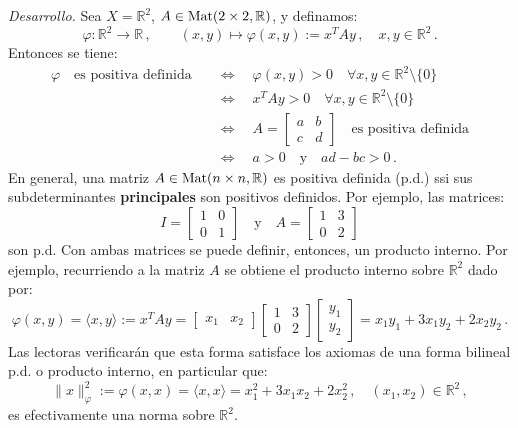 \documentclass[12pt,reqno]{amsart}
\begin{document}
\smallskip\noindent
\emph{Desarrollo.}
Sea $X=\mathbb{R}^2$, $A\in{\rm Mat}(2\times 2,\mathbb{R})$, y definamos:
\begin{equation*}
\varphi: \mathbb{R}^2 \rightarrow \mathbb{R}\,,\qquad
(x,y)\mapsto \varphi(x,y):= x^{T}Ay\,,\quad x,y\in\mathbb{R}^2\,.
\end{equation*}
Entonces se tiene:
\begin{align*}
\varphi\quad\text{es positiva definida}\quad
& \Leftrightarrow\quad \varphi(x,y)> 0\quad
  \forall x,y\in\mathbb{R}^2\setminus\{0\} \\
& \Leftrightarrow\quad x^{T}Ay> 0\quad
  \forall x,y\in\mathbb{R}^2\setminus\{0\}\quad \\
& \Leftrightarrow\quad 
  A=\begin{bmatrix} a & b \\ c & d \end{bmatrix}\quad
  \text{es positiva definida} \\
& \Leftrightarrow\quad 
  a>0\quad\text{y}\quad ad-bc>0\,.
\end{align*}
En general, una matriz $A\in{\rm Mat}(n\times n,\mathbb{R})$
es positiva definida (p.d.) ssi sus subdeterminantes
{\color{red}\bf principales} son positivos definidos.
Por ejemplo, las matrices:
$$
I=\begin{bmatrix} 1 & 0 \\ 0 & 1 \end{bmatrix}
\quad\text{y}\quad 
A=\begin{bmatrix} 1 & 3 \\ 0 & 2 \end{bmatrix}
$$
son p.d.
Con ambas matrices se puede definir, entonces, un producto interno.
Por ejemplo, recurriendo a la matriz $A$ se obtiene el producto interno
sobre $\mathbb{R}^2$ dado por:
$$
\varphi(x,y) = \langle x,y\rangle := x^{T}Ay
= \begin{bmatrix} x_1 & x_2 \end{bmatrix}
  \begin{bmatrix} 1 & 3 \\ 0 & 2 \end{bmatrix}
  \begin{bmatrix} y_1 \\ y_2 \end{bmatrix}
= x_1y_1 + 3x_1 y_2 + 2 x_2 y_2\,.
$$
Las lectoras verificar\'an que esta forma satisface los axiomas de una
forma bilineal p.d. o producto interno, en particular que:
$$
\|x\|_\varphi^2 := \varphi(x,x) = \langle x,x\rangle
= x_1^2 + 3x_1 x_2 + 2 x_2^2\,,\quad (x_1,x_2)\in\mathbb{R}^2\,,
$$
es efectivamente una norma sobre $\mathbb{R}^2$.
\end{document}
